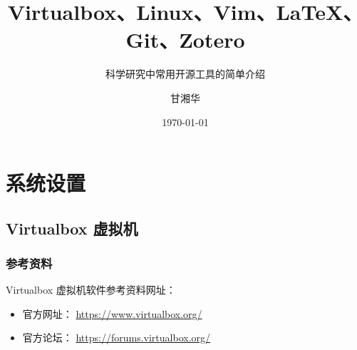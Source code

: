 \documentclass[
    11pt,
    cite=authoryear,
    device=normal,
    lang=cn,
    mode=simple,
    result=answer,
    toc=onecol,
]{elegantbook_sierxue}
\title{Virtualbox、Linux、Vim、\LaTeX{}、Git、Zotero}
\subtitle{科学研究中常用开源工具的简单介绍}
\author{甘湘华}
\institute{西南财经大学}
\date{\today}
\begin{document}
\maketitle

\setcounter{tocdepth}{2}
\tableofcontents

\mainmatter
\hypersetup{pageanchor=true}

\chapter{系统设置}
\label{cha:settings-system}

\section{Virtualbox 虚拟机}%
\label{sec:vbox}

\subsection{参考资料}%
\label{sub:vbox-refs}

Virtualbox 虚拟机软件参考资料网址：
\begin{itemize}
    \item 官方网址： \href{https://www.virtualbox.org/}{https://www.virtualbox.org/}
    \item 官方论坛： \href{https://forums.virtualbox.org/}{https://forums.virtualbox.org/}
\end{itemize}
\end{document}
